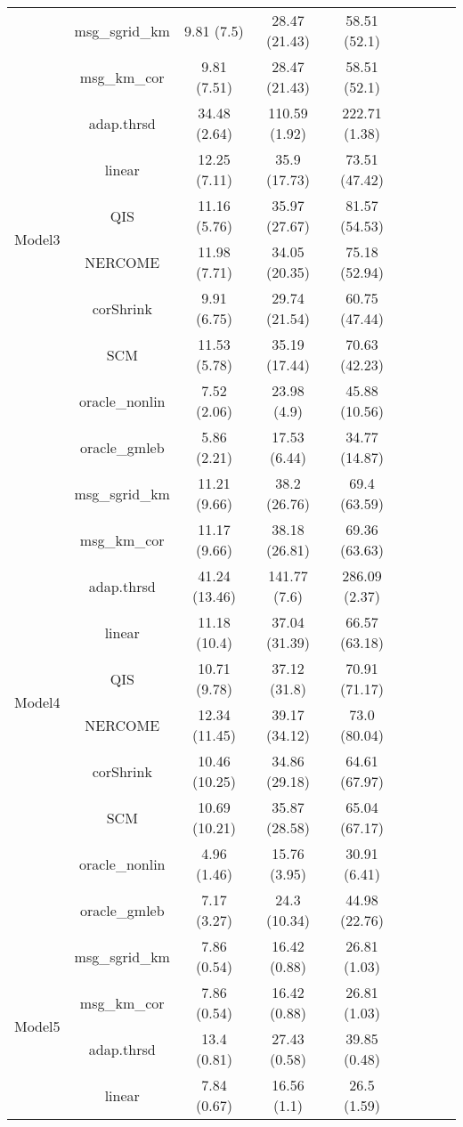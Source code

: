\documentclass[useAMS,referee,usenatbib]{biom}
\begin{document}
\begin{table}[H]
{\begin{tabular}{ccccccccc}
\multirow{10}{*}{Model3}   
 & msg\_sgrid\_km & 9.81 (7.5)   & 28.47 (21.43) & 58.51 (52.1)  \\
 & msg\_km\_cor   & 9.81 (7.51)  & 28.47 (21.43) & 58.51 (52.1)  \\
 & adap.thrsd     & 34.48 (2.64) & 110.59 (1.92) & 222.71 (1.38) \\
 & linear         & 12.25 (7.11) & 35.9 (17.73)  & 73.51 (47.42) \\
 & QIS            & 11.16 (5.76) & 35.97 (27.67) & 81.57 (54.53) \\
 & NERCOME        & 11.98 (7.71) & 34.05 (20.35) & 75.18 (52.94) \\
 & corShrink      & 9.91 (6.75)  & 29.74 (21.54) & 60.75 (47.44) \\
 & SCM            & 11.53 (5.78) & 35.19 (17.44) & 70.63 (42.23) \\
 & oracle\_nonlin & 7.52 (2.06)  & 23.98 (4.9)   & 45.88 (10.56) \\
 & oracle\_gmleb  & 5.86 (2.21)  & 17.53 (6.44)  & 34.77 (14.87) \\ \midrule
\multirow{10}{*}{Model4}  
 & msg\_sgrid\_km & 11.21 (9.66)  & 38.2 (26.76)  & 69.4 (63.59)  \\
 & msg\_km\_cor   & 11.17 (9.66)  & 38.18 (26.81) & 69.36 (63.63) \\
 & adap.thrsd     & 41.24 (13.46) & 141.77 (7.6)  & 286.09 (2.37) \\
 & linear         & 11.18 (10.4)  & 37.04 (31.39) & 66.57 (63.18) \\
 & QIS            & 10.71 (9.78)  & 37.12 (31.8)  & 70.91 (71.17) \\
 & NERCOME        & 12.34 (11.45) & 39.17 (34.12) & 73.0 (80.04)  \\
 & corShrink      & 10.46 (10.25) & 34.86 (29.18) & 64.61 (67.97) \\
 & SCM            & 10.69 (10.21) & 35.87 (28.58) & 65.04 (67.17) \\
 & oracle\_nonlin & 4.96 (1.46)   & 15.76 (3.95)  & 30.91 (6.41)  \\
 & oracle\_gmleb  & 7.17 (3.27)   & 24.3 (10.34)  & 44.98 (22.76)\\ \midrule
\multirow{10}{*}{Model5}  
 & msg\_sgrid\_km & 7.86 (0.54)  & 16.42 (0.88) & 26.81 (1.03)  \\
 & msg\_km\_cor   & 7.86 (0.54)  & 16.42 (0.88) & 26.81 (1.03)  \\
 & adap.thrsd     & 13.4 (0.81)  & 27.43 (0.58) & 39.85 (0.48)  \\
 & linear         & 7.84 (0.67)  & 16.56 (1.1)  & 26.5 (1.59)   \\

\end{tabular}}
\end{table}
\end{document}
